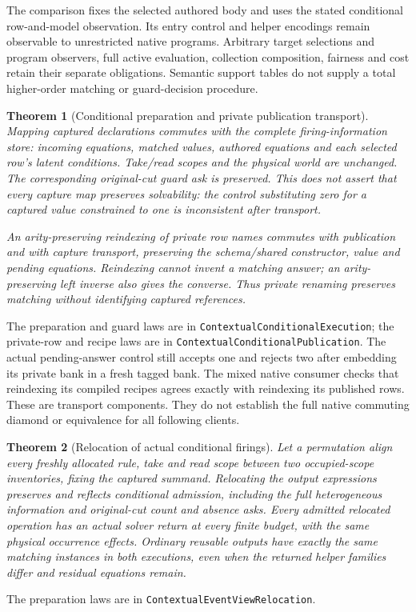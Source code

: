 \documentclass[11pt]{article}
\newtheorem{theorem}{Theorem}
\newcommand{\code}[1]{\texttt{\small #1}}
\begin{document}
The comparison fixes the selected authored body and uses the stated
conditional row-and-model observation. Its entry control and helper
encodings remain observable to unrestricted native programs.
Arbitrary target selections and program observers, full active evaluation, collection
composition, fairness and cost retain their separate obligations.
Semantic support tables do not supply a total higher-order matching or
guard-decision procedure.

\begin{theorem}[Conditional preparation and private publication transport]
Mapping captured declarations commutes with the complete firing-information
store: incoming equations, matched values, authored equations and each
selected row's latent conditions. Take/read scopes and the physical world
are unchanged. The corresponding original-cut guard ask is preserved.
This does not assert that every capture map preserves solvability: the
control substituting zero for a captured value constrained to one is
inconsistent after transport.

An arity-preserving reindexing of private row names commutes with publication
and with capture transport, preserving the schema/shared constructor, value
and pending equations. Reindexing cannot invent a matching answer; an
arity-preserving left inverse also gives the converse. Thus private
renaming preserves matching without identifying captured references.
\end{theorem}
The preparation and guard laws are in
\code{ContextualConditionalExecution}; the private-row and recipe laws are
in \code{ContextualConditionalPublication}. The actual pending-answer
control still accepts one and rejects two after embedding its private bank
in a fresh tagged bank. The mixed native consumer checks that reindexing
its compiled recipes agrees exactly with reindexing its published rows.
These are transport components. They do not establish the full native
commuting diamond or equivalence for all following clients.

\begin{theorem}[Relocation of actual conditional firings]
Let a permutation align every freshly allocated rule, take and read scope
between two occupied-scope inventories, fixing the captured summand.
Relocating the output expressions preserves and reflects conditional
admission, including the full heterogeneous information and original-cut
count and absence asks. Every admitted relocated operation has an actual
solver return at every finite budget, with the same physical occurrence
effects. Ordinary reusable outputs have exactly the same matching instances
in both executions, even when the returned helper families differ and
residual equations remain.
\end{theorem}
The preparation laws are in \code{ContextualEventViewRelocation}.
\end{document}
